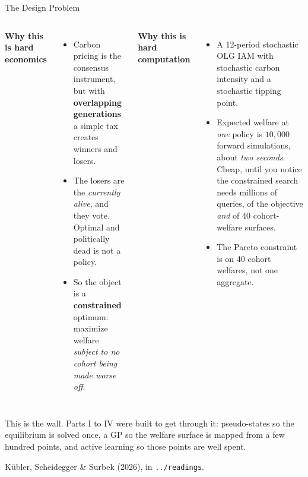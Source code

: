 \documentclass[aspectratio=169,11pt]{beamer}
\newcommand{\emphc}[1]{\textcolor{harvardcrimson}{#1}}
\begin{document}
\begin{frame}{The Design Problem}
\footnotesize
\begin{columns}[T]
\textbf{Why this is hard economics}
\begin{itemize}\itemsep2pt
  \item Carbon pricing is the consensus instrument, but with \textbf{overlapping generations} a simple tax creates winners and losers.
  \item The losers are the \emph{currently alive}, and they vote. Optimal and politically dead is not a policy.
  \item So the object is a \textbf{constrained} optimum: maximize welfare \emph{subject to no cohort being made worse off}.
\end{itemize}

\textbf{Why this is hard computation}
\begin{itemize}\itemsep2pt
  \item A 12-period stochastic OLG IAM with stochastic carbon intensity and a stochastic tipping point.
  \item Expected welfare at \emph{one} policy is $10{,}000$ forward simulations, about \emph{two seconds}. Cheap, until you notice the constrained search needs \emphc{millions} of queries, of the objective \emph{and} of 40 cohort-welfare surfaces.
  \item The Pareto constraint is on \emphc{40 cohort welfares}, not one aggregate.
\end{itemize}
\end{columns}

\vspace{0.3em}
\emphc{This is the wall.} Parts I to IV were built to get through it: pseudo-states so the equilibrium is solved once, a GP so the welfare surface is mapped from a few hundred points, and active learning so those points are well spent.

\vspace{0.15em}
{\scriptsize K\"ubler, Scheidegger \& Surbek (2026), in \texttt{../readings}.}
\end{frame}
\end{document}
